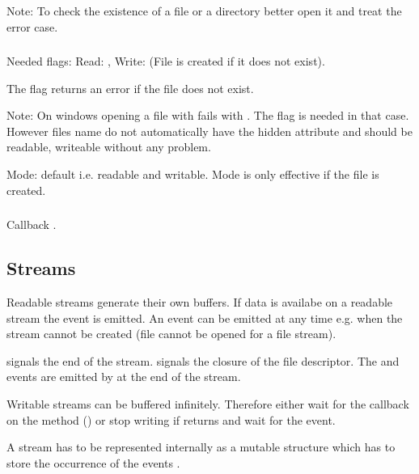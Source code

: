 Note: To check the existence of a file or a directory better open it and treat
the error case.

\subsubsection{}

Needed flags: Read: , Write:  (File is created if it does
not exist).

The flag  returns an error if the file does not exist.

Note: On windows opening a file with  fails with . The
 flag is needed in that case. However files name  do
not automatically have the hidden attribute and should be readable, writeable
without any problem.

Mode: default  i.e. readable and writable. Mode is only effective
if the file is created.

\subsubsection{}

Callback .






\subsection{Streams}

Readable streams generate their own buffers. If data is availabe on a readable
stream the event  is emitted. An  event can be
emitted at any time e.g. when the stream cannot be created (file cannot be
opened for a file stream).

 signals the end of the stream.  signals the closure of
the file descriptor. The  and  events are emitted by
 at the end of the stream.

Writable streams can be buffered infinitely. Therefore either wait for the
callback on the  method () or stop writing
if  returns  and wait for the  event.

A stream has to be represented internally as a mutable structure which has to
store the occurrence of the events .

